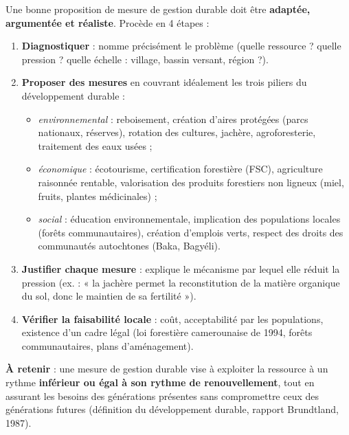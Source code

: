 \documentclass[11pt]{article}
\newcommand{\cle}[1]{{\popxbold\color{popdark}#1}}
\begin{document}
\begin{methode}
Une bonne proposition de mesure de gestion durable doit être \textbf{adaptée, argumentée et réaliste}. Procède en 4 étapes :
\begin{enumerate}
\item \textbf{Diagnostiquer} : nomme précisément le problème (quelle ressource ? quelle pression ? quelle échelle : village, bassin versant, région ?).
\item \textbf{Proposer des mesures} en couvrant idéalement les trois piliers du \cle{développement durable} :
\begin{itemize}
\item \emph{environnemental} : reboisement, création d'aires protégées (parcs nationaux, réserves), rotation des cultures, jachère, agroforesterie, traitement des eaux usées ;
\item \emph{économique} : écotourisme, certification forestière (FSC), agriculture raisonnée rentable, valorisation des produits forestiers non ligneux (miel, fruits, plantes médicinales) ;
\item \emph{social} : éducation environnementale, implication des populations locales (forêts communautaires), création d'emplois verts, respect des droits des communautés autochtones (Baka, Bagyéli).
\end{itemize}
\item \textbf{Justifier chaque mesure} : explique le mécanisme par lequel elle réduit la pression (ex. : « la jachère permet la reconstitution de la matière organique du sol, donc le maintien de sa fertilité »).
\item \textbf{Vérifier la faisabilité locale} : coût, acceptabilité par les populations, existence d'un cadre légal (loi forestière camerounaise de 1994, forêts communautaires, plans d'aménagement).
\end{enumerate}
\textbf{À retenir} : une mesure de gestion durable vise à exploiter la ressource à un rythme \textbf{inférieur ou égal à son rythme de renouvellement}, tout en assurant les besoins des générations présentes sans compromettre ceux des générations futures (définition du développement durable, rapport Brundtland, 1987).
\end{methode}
\end{document}
